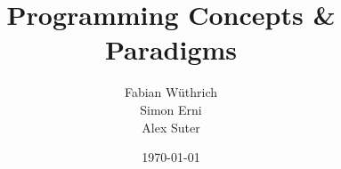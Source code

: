 \titlehead{Hochschule Luzern \\ 
	Technik \& Architektur}
\subject{Zusammenfassung}
\title{Programming Concepts \& Paradigms}
\subtitle{}
\author{Fabian Wüthrich \\ 
	Simon Erni \\
	Alex Suter}
\date{\today}

\maketitle
